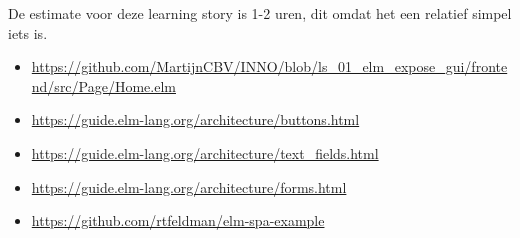 \documentclass{article}
\begin{document}
    {
        De estimate voor deze learning story is 1-2 uren, dit omdat het een relatief simpel iets is.
    }
    {
        \begin{itemize}
            \item \url{https://github.com/MartijnCBV/INNO/blob/ls_01_elm_expose_gui/frontend/src/Page/Home.elm}
        \end{itemize}
    }
    {
        \begin{itemize}
            \item \url{https://guide.elm-lang.org/architecture/buttons.html}
            \item \url{https://guide.elm-lang.org/architecture/text_fields.html}
            \item \url{https://guide.elm-lang.org/architecture/forms.html}
            \item \url{https://github.com/rtfeldman/elm-spa-example}
        \end{itemize}
    }
\end{document}
